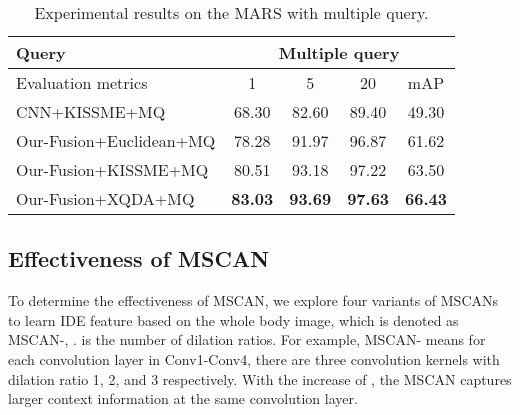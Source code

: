 \documentclass[10pt,twocolumn,letterpaper]{article}
\begin{document}
\begin{table}[!tbp]
  \begin{center}
  \scriptsize
    \begin{tabular}{|l|cccc|}
    \hline
    Query & \multicolumn{4}{c|}{Multiple query} \\
    \hline
    Evaluation metrics & 1     & 5     & 20    & mAP \\
    \hline
    \hline
    CNN+KISSME+MQ~\cite{ZhengliangECCV16} & 68.30  & 82.60  & 89.40  & 49.30  \\
    \hline
    Our-Fusion+Euclidean+MQ & 78.28  & 91.97  & 96.87  & 61.62    \\
    Our-Fusion+KISSME+MQ & 80.51  & 93.18  & 97.22  & 63.50    \\
    Our-Fusion+XQDA+MQ & \textbf{83.03}  & \textbf{93.69}  & \textbf{97.63}  & \textbf{66.43}  \\
    \hline
    \end{tabular}\end{center}
    \vspace{-0.5em}
  \caption{Experimental results on the MARS with multiple query.}
  \vspace{-1em}
  \label{tab:marsresults_mutiple}\end{table}



\subsection{Effectiveness of MSCAN}
\label{exp:effmscan}
To determine the effectiveness of MSCAN, we explore four variants of MSCANs to learn IDE feature based on the whole body image, which is denoted as MSCAN-, .
 is the number of dilation ratios.
For example, MSCAN- means for each convolution layer in Conv1-Conv4, there are three convolution kernels with dilation ratio 1, 2, and 3 respectively.
With the increase of , the MSCAN captures larger context information at the same convolution layer.
\end{document}
